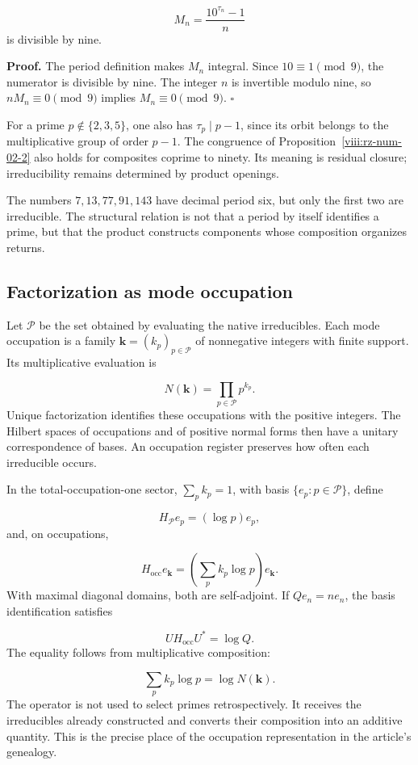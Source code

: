 \[
M_n=\frac{10^{\tau_n}-1}{n}
\]
is divisible by nine.

\textbf{Proof.} The period definition makes $M_n$ integral. Since $10\equiv1\pmod9$, the numerator is divisible by nine. The integer $n$ is invertible modulo nine, so $nM_n\equiv0\pmod9$ implies $M_n\equiv0\pmod9$. \hfill\(\square\)

For a prime $p\notin\{2,3,5\}$, one also has $\tau_p\mid p-1$, since its orbit belongs to the multiplicative group of order $p-1$. The congruence of Proposition~\ref{viii:rz-num-02-2} also holds for composites coprime to ninety. Its meaning is residual closure; irreducibility remains determined by product openings.

The numbers $7,13,77,91,143$ have decimal period six, but only the first two are irreducible. The structural relation is not that a period by itself identifies a prime, but that the product constructs components whose composition organizes returns.

\subsection{Factorization as mode occupation}
Let $\mathcal P$ be the set obtained by evaluating the native irreducibles. Each mode occupation is a family $\mathbf k=(k_p)_{p\in\mathcal P}$ of nonnegative integers with finite support. Its multiplicative evaluation is

\[
N(\mathbf k)=\prod_{p\in\mathcal P}p^{k_p}.
\]
Unique factorization identifies these occupations with the positive integers. The Hilbert spaces of occupations and of positive normal forms then have a unitary correspondence of bases. An occupation register preserves how often each irreducible occurs.

In the total-occupation-one sector, \(\sum_p k_p=1\), with basis \(\{e_p:p\in\mathcal P\}\), define

\[
H_{\mathcal P}e_p=(\log p)e_p,
\]
and, on occupations,

\[
H_{\mathrm{occ}}e_{\mathbf k}
=\left(\sum_pk_p\log p\right)e_{\mathbf k}.
\]
With maximal diagonal domains, both are self-adjoint. If $Qe_n=ne_n$, the basis identification satisfies

\[
U H_{\mathrm{occ}}U^*=\log Q.
\]
The equality follows from multiplicative composition:

\[
\sum_pk_p\log p=\log N(\mathbf k).
\]
The operator is not used to select primes retrospectively. It receives the irreducibles already constructed and converts their composition into an additive quantity. This is the precise place of the occupation representation in the article's genealogy.

